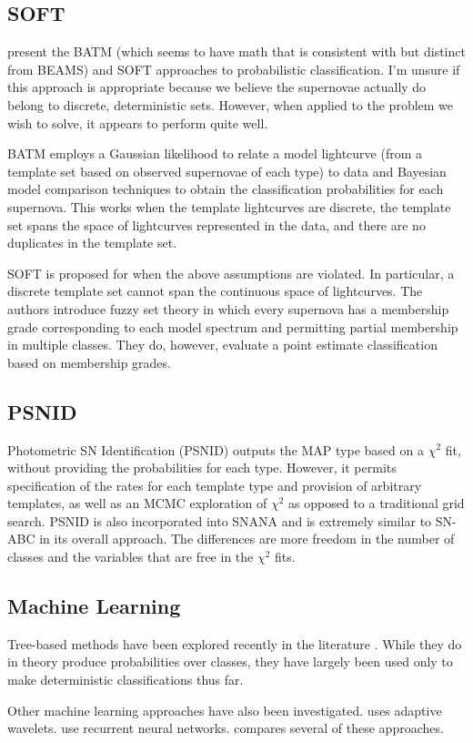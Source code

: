 \documentclass[12pt, onecolumn]{emulateapj}
\begin{document}
\subsection{SOFT}

\citep{Rodney09, Rodney10} present the BATM (which seems to have math that is consistent with but distinct from BEAMS) and SOFT approaches to probabilistic classification.  I'm unsure if this approach is appropriate because we believe the supernovae actually do belong to discrete, deterministic sets.  However, when applied to the problem we wish to solve, it appears to perform quite well.

BATM employs a Gaussian likelihood to relate a model lightcurve (from a template set based on observed supernovae of each type) to data and Bayesian model comparison techniques to obtain the classification probabilities for each supernova.  This works when the template lightcurves are discrete, the template set spans the space of lightcurves represented in the data, and there are no duplicates in the template set.  

SOFT is proposed for when the above assumptions are violated.  In particular, a discrete template set cannot span the continuous space of lightcurves.  The authors introduce fuzzy set theory in which every supernova has a membership grade corresponding to each model spectrum and permitting partial membership in multiple classes.  They do, however, evaluate a point estimate classification based on membership grades.

\subsection{PSNID}

Photometric SN Identification (PSNID) \citep{Sako11} outputs the MAP type based on a $\chi^{2}$ fit, without providing the probabilities for each type.  However, it permits specification of the rates for each template type and provision of arbitrary templates, as well as an MCMC exploration of $\chi^{2}$ as opposed to a traditional grid search.  PSNID is also incorporated into SNANA and is extremely similar to SN-ABC in its overall approach.  The differences are more freedom in the number of classes and the variables that are free in the $\chi^{2}$ fits.

\subsection{Machine Learning}

Tree-based methods have been explored recently in the literature \citep{Richards11, Lochner16, Moller16}.  While they do in theory produce probabilities over classes, they have largely been used only to make deterministic classifications thus far.  

Other machine learning approaches have also been investigated.  \citet{Varughese15} uses adaptive wavelets.  \citet{Karpenka12, Charnock16} use recurrent neural networks.  \citet{Lochner16} compares several of these approaches.




\end{document}
